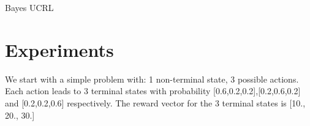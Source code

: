 \documentclass[a4paper,man,natbib]{apa6}
\begin{document}
\begin{algorithm}
	\caption{Bayes UCRL}    \label{alg:IAVF}
\end{algorithm} 

\section{Experiments}
We start with a simple problem with: 1 non-terminal state, 3 possible actions. Each action leads to 3 terminal states with probability [0.6,0.2,0.2],[0.2,0.6,0.2] and [0.2,0.2,0.6] respectively. The reward vector for the 3 terminal states is [10., 20., 30.]
\end{document}
